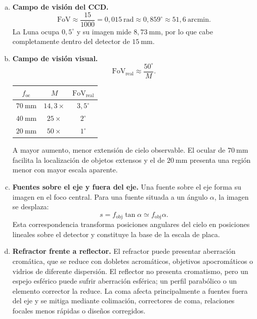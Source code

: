 \begin{enumerate}[a)]
    \item \textbf{Campo de visión del CCD.}
    \[
        \mathrm{FoV}\approx\frac{15}{1000}
        =0{,}015~\text{rad}
        \approx0{,}859^\circ
        \approx51{,}6~\text{arcmin}.
    \]
    La Luna ocupa $0{,}5^\circ$ y su imagen mide $8{,}73~\text{mm}$, por lo que
    cabe completamente dentro del detector de $15~\text{mm}$.

    

    \item \textbf{Campo de visión visual.}
    \[
        \mathrm{FoV}_{\text{real}}
        \approx\frac{50^\circ}{M}.
    \]
    \begin{center}
    \begin{tabular}{ccc}
        \toprule
        $f_{\text{oc}}$ & $M$ & $\mathrm{FoV}_{\text{real}}$ \\
        \midrule
        $70~\text{mm}$ & $14{,}3\times$ & $3{,}5^\circ$ \\
        $40~\text{mm}$ & $25\times$ & $2^\circ$ \\
        $20~\text{mm}$ & $50\times$ & $1^\circ$ \\
        \bottomrule
    \end{tabular}
    \end{center}
    A mayor aumento, menor extensión de cielo observable. El ocular de
    $70~\text{mm}$ facilita la localización de objetos extensos y el de
    $20~\text{mm}$ presenta una región menor con mayor escala aparente.

    \item \textbf{Fuentes sobre el eje y fuera del eje.}
    Una fuente sobre el eje forma su imagen en el foco central. Para una fuente
    situada a un ángulo $\alpha$, la imagen se desplaza:
    \[
        s=f_{\text{obj}}\tan\alpha
        \simeq f_{\text{obj}}\alpha.
    \]
    Esta correspondencia transforma posiciones angulares del cielo en
    posiciones lineales sobre el detector y constituye la base de la escala de
    placa.

    \item \textbf{Refractor frente a reflector.}
    El refractor puede presentar aberración cromática, que se reduce con
    dobletes acromáticos, objetivos apocromáticos o vidrios de diferente
    dispersión. El reflector no presenta cromatismo, pero un espejo esférico
    puede sufrir aberración esférica; un perfil parabólico o un elemento
    corrector la reduce. La coma afecta principalmente a fuentes fuera del eje
    y se mitiga mediante colimación, correctores de coma, relaciones focales
    menos rápidas o diseños corregidos.


\end{enumerate}
